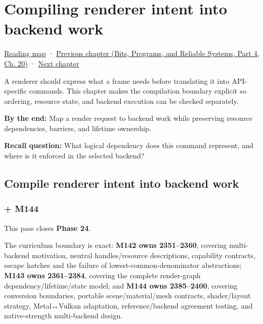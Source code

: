 \chapter{Compiling renderer intent into backend work}\label{06-engine-ii-ch043-compiling-renderer-intent-into-backend-work}\hypertarget{06-engine-ii-ch043}{}\label{stagechapter:06-engine-ii-ch043}

\hypertarget{06-engine-ii-ch043-compiling-renderer-intent-into-backend-work}{}

\hyperref[volume-reading-map]{Reading map} · \href{../01-Bits-Programs-and-Reliable-Systems-P04/main.pdf\#nameddest=06-engine-ii-ch042-from-cartridge-bytes-to-a-reproducible-machine}{Previous chapter (Bits, Programs, and Reliable Systems, Part 4, Ch. 20)} · \hyperref[06-engine-ii-ch044-cross-backend-conversion-and-agreement]{Next chapter}

A renderer should express what a frame needs before translating it into API-specific commands. This chapter makes the compilation boundary explicit so ordering, resource state, and backend execution can be checked separately.

\textbf{By the end:} Map a render request to backend work while preserving resource dependencies, barriers, and lifetime ownership.

\textbf{Recall question:} What logical dependency does this command represent, and where is it enforced in the selected backend?

\section{Compile renderer intent into backend work}\label{06-engine-ii-ch043-compile-renderer-intent-into-backend-work}

\hypertarget{06-engine-ii-ch043-compile-renderer-intent-into-backend-work}{}

\subsection{+ M144}\label{06-engine-ii-ch043-m144}

\hypertarget{06-engine-ii-ch043-m144}{}

This pass closes \textbf{Phase 24}.

The curriculum boundary is exact: \textbf{M142 owns 2351--2360}, covering multi-backend motivation, neutral handles/resource descriptions, capability contracts, escape hatches and the failure of lowest-common-denominator abstractions; \textbf{M143 owns 2361--2384}, covering the complete render-graph dependency/lifetime/state model; and \textbf{M144 owns 2385--2400}, covering conversion boundaries, portable scene/material/mesh contracts, shader/layout strategy, Metal↔Vulkan adaptation, reference/backend agreement testing, and native-strength multi-backend design.

